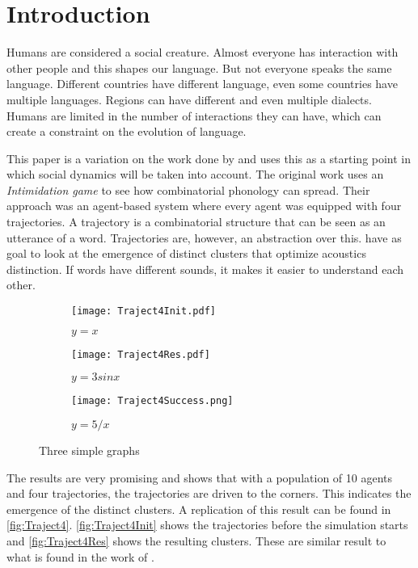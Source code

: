 \section{Introduction}
Humans are considered a social creature.
Almost everyone has interaction with other people and this shapes our language.
But not everyone speaks the same language.
Different countries have different language, even some countries have multiple languages.
Regions can have different and even multiple dialects.
Humans are limited in the number of interactions they can have, which can create a constraint on the evolution of language.

This paper is a variation on the work done by \cite{de2010multi} and uses this as a starting point in which social dynamics will be taken into account.
The original work uses an \textit{Intimidation game} to see how combinatorial phonology can spread.
Their approach was an agent-based system where every agent was equipped with four trajectories.
A trajectory is a combinatorial structure that can be seen as an utterance of a word.
Trajectories are, however, an abstraction over this.
\citeauthor{de2010multi} have as goal to look at the emergence of distinct clusters that optimize acoustics distinction.
If words have different sounds, it makes it easier to understand each other.

\begin{figure}[t]
    \centering
    \begin{subfigure}[b]{0.3\textwidth}
        \centering
        \texttt{[image: Traject4Init.pdf]}
        \caption{$y=x$}
        \label{fig:Traject4Init}
    \end{subfigure}
    \hfill
    \begin{subfigure}[b]{0.3\textwidth}
        \centering
        \texttt{[image: Traject4Res.pdf]}
        \caption{$y=3sinx$}
        \label{fig:Traject4Res}
    \end{subfigure}
    \hfill
    \begin{subfigure}[b]{0.3\textwidth}
        \centering
        \texttt{[image: Traject4Success.png]}
        \caption{$y=5/x$}
        \label{fig:Traject4Success}
    \end{subfigure}

    \caption{Three simple graphs}
    \label{fig:Traject4}
\end{figure}

The results are very promising and shows that with a population of 10 agents and four trajectories, the trajectories are driven to the corners.
This indicates the emergence of the distinct clusters.
A replication of this result can be found in \autoref{fig:Traject4}.
\autoref{fig:Traject4Init} shows the trajectories before the simulation starts and \autoref{fig:Traject4Res} shows the resulting clusters.
These are similar result to what is found in the work of \cite{de2010multi}.

